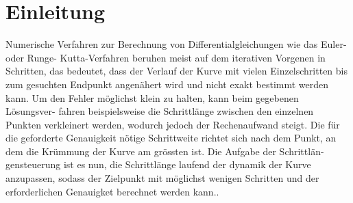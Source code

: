 %
%
%
\section{Einleitung\label{steps:section:einleitung}}

Numerische Verfahren zur Berechnung von Differentialgleichungen wie das Euler- oder Runge-
Kutta-Verfahren beruhen meist auf dem iterativen Vorgenen in Schritten, das bedeutet, dass der Verlauf
der Kurve mit vielen Einzelschritten bis zum gesuchten Endpunkt angenähert wird und nicht exakt
bestimmt werden kann. Um den Fehler möglichst klein zu halten, kann beim gegebenen Lösungsver-
fahren beispielsweise die Schrittlänge zwischen den einzelnen Punkten verkleinert werden, wodurch
jedoch der Rechenaufwand steigt. Die für die geforderte Genauigkeit nötige Schrittweite richtet sich
nach dem Punkt, an dem die Krümmung der Kurve am grössten ist. Die Aufgabe der Schrittlän-
gensteuerung ist es nun, die Schrittlänge laufend der dynamik der Kurve anzupassen, sodass der
Zielpunkt mit möglichst wenigen Schritten und der erforderlichen Genauigket berechnet werden
kann.\cite{steps:bibtex}.
